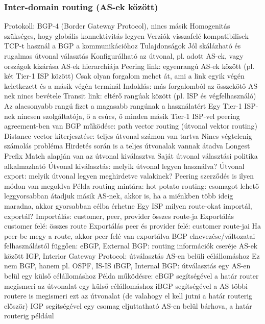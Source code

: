 \documentclass[12pt,a4paper]{article}
\begin{document}
\subsubsection{Inter-domain routing (AS-ek között)}

\begin{outline}
	\1 Protokoll: BGP-4 (Border Gateway Protocol), nincs másik
		\2 Homogenitás szükséges, hogy globális konnektivitás legyen
		\2 Verziók visszafelé kompatibilisek
		\2 TCP-t használ a BGP a kommunikációhoz
	\1 Tulajdonságok
		\2 Jól skálázható és rugalmas útvonal választás
		\2 Konfigurálható az útvonal, pl. adott AS-ek, vagy országok kizárása
	\1 AS-ek hierarchiája
		\2 Peering link: egyenrangú AS-ek között (pl. két Tier-1 ISP között)
			\3 Csak olyan forgalom mehet át, ami a link egyik végén keletkezett és a másik végén terminál
			\3 Indoklás: más forgalomból az összekötő AS-nek nincs bevétele
		\2 Transit link: eltérő rangúak között (pl. ISP és végfelhasználó)
			\3 Az alacsonyabb rangú fizet a magasabb rangúnak a használatért
		\2 Egy Tier-1 ISP-nek nincsen szolgáltatója, ő a csúcs, ő minden másik Tier-1 ISP-vel peering agreement-ben van
\pagebreak
	\1 BGP működése: path vector routing (útvonal vektor routing)
		\2 Distance vector kiterjesztése: teljes útvonal számon van tartva
			\3 Nincs végtelenig számolás probléma
			\3 Hirdetés során is a teljes útvonalak vannak átadva
		\2 Longest Prefix Match alapján van az útvonal kiválasztva
		\2 Saját útvonal választási politika alkalmazható
			\3 Útvonal kiválasztás: melyik útvonal legyen használva?
			\3 Útvonal export: melyik útvonal legyen meghirdetve valakinek?
			\3 Peering szerződés is ilyen módon van megoldva
		\2 Példa routing mintára: hot potato routing: csomagot lehető leggyorsabban átadjuk másik AS-nek, akkor is, ha a miénkben több ideig maradna, akkor gyorsabban célba érhetne
		\2 Egy ISP milyen route-okat importál, exportál?
			\3 Importálás: customer, peer, provider összes route-ja
			\3 Exportálás customer felé: összes route
			\3 Exportálás peer és provider felé: customer route-jai
				\4 Ha peer-be megy a route, akkor peer felé van exportálva
	\1 BGP elnevezése/változatai felhasználástól függően:
		\2 eBGP, External BGP: routing információk cseréje AS-ek között
		\2 IGP, Interior Gateway Protocol: útválasztás AS-en belüli célállomáshoz
			\3 Ez nem BGP, hanem pl. OSPF, IS-IS
		\2 iBGP, Internal BGP: útválasztás egy AS-en belül egy külső célállomáshoz
		\2 Példa működésre:
			\3 eBGP segítségével a határ router megismeri az útvonalat egy külső célállomáshoz
			\3 iBGP segítségével a AS többi routere is megismeri ezt az útvonalat (de valahogy el kell jutni a határ routerig először)
			\3 IGP segítségével egy csomag eljuttatható AS-en belül bárhova, a határ routerig például
\end{outline}
\end{document}
